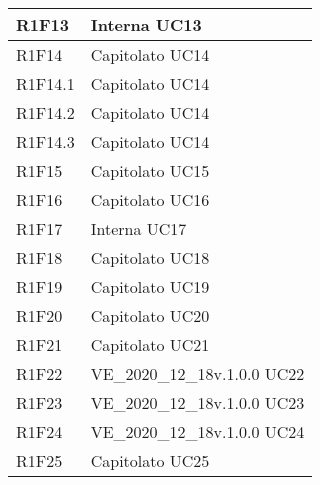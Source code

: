 \begin{center}
\begin{longtable}{|p{22mm}|p{44mm}|}
R1F13 &
Interna \newline
UC13 
\\
\hline

R1F14 &
Capitolato \newline
UC14 
\\
\hline

R1F14.1 &
Capitolato \newline
UC14 
\\
\hline

R1F14.2 &
Capitolato \newline
UC14 
\\
\hline

R1F14.3 &
Capitolato \newline
UC14 
\\
\hline

R1F15 &
Capitolato \newline
UC15 
\\
\hline

R1F16 &
Capitolato \newline
UC16 
\\
\hline

R1F17 &
Interna \newline
UC17 
\\
\hline

R1F18 &
Capitolato \newline
UC18 
\\
\hline

R1F19 &
Capitolato \newline
UC19 
\\
\hline

R1F20 &
Capitolato \newline
UC20 
\\
\hline

R1F21 &
Capitolato \newline
UC21 
\\
\hline

R1F22 &
VE\_2020\_12\_18v.1.0.0 \newline
UC22 
\\
\hline

R1F23 &
VE\_2020\_12\_18v.1.0.0 \newline
UC23 
\\
\hline

R1F24 &
VE\_2020\_12\_18v.1.0.0 \newline
UC24 
\\
\hline

R1F25 &
Capitolato \newline
UC25 
\\
\hline


\end{longtable}
\end{center}
